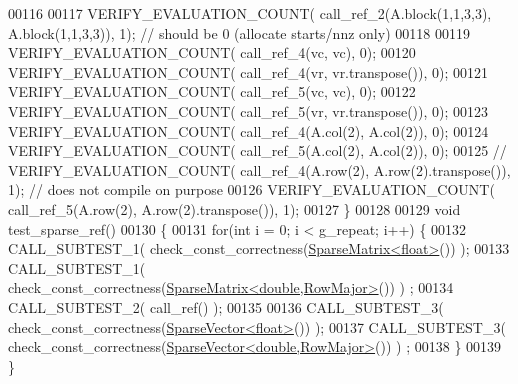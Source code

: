 \begin{DoxyCode}
00116   
00117   VERIFY\_EVALUATION\_COUNT( call\_ref\_2(A.block(1,1,3,3), A.block(1,1,3,3)),  1); \textcolor{comment}{// should be 0 (allocate
       starts/nnz only)}
00118 
00119   VERIFY\_EVALUATION\_COUNT( call\_ref\_4(vc, vc),  0);
00120   VERIFY\_EVALUATION\_COUNT( call\_ref\_4(vr, vr.transpose()),  0);
00121   VERIFY\_EVALUATION\_COUNT( call\_ref\_5(vc, vc),  0);
00122   VERIFY\_EVALUATION\_COUNT( call\_ref\_5(vr, vr.transpose()),  0);
00123   VERIFY\_EVALUATION\_COUNT( call\_ref\_4(A.col(2), A.col(2)),  0);
00124   VERIFY\_EVALUATION\_COUNT( call\_ref\_5(A.col(2), A.col(2)),  0);
00125   \textcolor{comment}{// VERIFY\_EVALUATION\_COUNT( call\_ref\_4(A.row(2), A.row(2).transpose()),  1); // does not compile on
       purpose}
00126   VERIFY\_EVALUATION\_COUNT( call\_ref\_5(A.row(2), A.row(2).transpose()),  1);
00127 \}
00128 
00129 \textcolor{keywordtype}{void} test\_sparse\_ref()
00130 \{
00131   \textcolor{keywordflow}{for}(\textcolor{keywordtype}{int} i = 0; i < g\_repeat; i++) \{
00132     CALL\_SUBTEST\_1( check\_const\_correctness(\hyperlink{group___sparse_core___module_class_eigen_1_1_sparse_matrix}{SparseMatrix<float>}()) );
00133     CALL\_SUBTEST\_1( check\_const\_correctness(\hyperlink{group___sparse_core___module_class_eigen_1_1_sparse_matrix}{SparseMatrix<double,RowMajor>}()) )
      ;
00134     CALL\_SUBTEST\_2( call\_ref() );
00135 
00136     CALL\_SUBTEST\_3( check\_const\_correctness(\hyperlink{group___sparse_core___module_class_eigen_1_1_sparse_vector}{SparseVector<float>}()) );
00137     CALL\_SUBTEST\_3( check\_const\_correctness(\hyperlink{group___sparse_core___module_class_eigen_1_1_sparse_vector}{SparseVector<double,RowMajor>}()) )
      ;
00138   \}
00139 \}
\end{DoxyCode}
